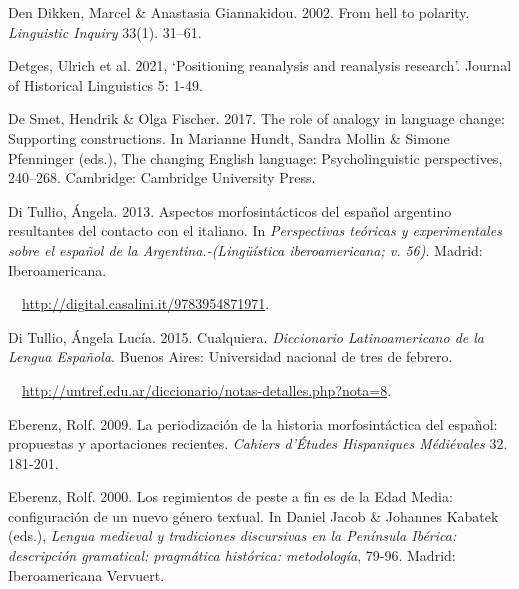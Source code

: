 \begin{styleStandard}
Den Dikken, Marcel \& Anastasia Giannakidou. 2002. From hell to polarity. \textit{Linguistic Inquiry }33(1). 31–61.
\end{styleStandard}

\begin{styleStandard}
Detges, Ulrich et al. 2021, ‘Positioning reanalysis and reanalysis research’. Journal of Historical Linguistics 5: 1-49.
\end{styleStandard}

\begin{styleStandard}
De Smet, Hendrik \& Olga Fischer. 2017. The role of analogy in language change: Supporting constructions. In Marianne Hundt, Sandra Mollin \& Simone Pfenninger (eds.), The changing English language: Psycholinguistic perspectives, 240–268. Cambridge: Cambridge University Press.
\end{styleStandard}

\begin{styleStandard}
Di Tullio, Ángela. 2013. Aspectos morfosintácticos del español argentino resultantes del contacto con el italiano. In \textit{Perspectivas teóricas y experimentales sobre el español de la Argentina.-(Lingüística iberoamericana; v. 56)}. Madrid: Iberoamericana. 
\end{styleStandard}

\begin{styleStandard}
\ \ \url{http://digital.casalini.it/9783954871971}.
\end{styleStandard}

\begin{styleStandard}
Di Tullio, Ángela Lucía. 2015. Cualquiera. \textit{Diccionario Latinoamericano de la Lengua Española}. Buenos Aires: Universidad nacional de tres de febrero. 
\end{styleStandard}

\begin{styleStandard}
\ \ \url{http://untref.edu.ar/diccionario/notas-detalles.php?nota=8}.
\end{styleStandard}

\begin{styleStandard}
Eberenz, Rolf. 2009. La periodización de la historia morfosintáctica del español: propuestas y aportaciones recientes. \textit{Cahiers d'Études Hispaniques Médiévales} 32. 181-201. 
\end{styleStandard}

\begin{styleStandard}
Eberenz, Rolf. 2000. Los regimientos de peste a fin es de la Edad Media: configuración de un nuevo género textual. In Daniel Jacob \& Johannes Kabatek (eds.), \textit{Lengua medieval y tradiciones discursivas en la Península Ibérica: descripción gramatical: pragmática histórica: metodología}, 79-96. Madrid: Iberoamericana Vervuert. 
\end{styleStandard}

